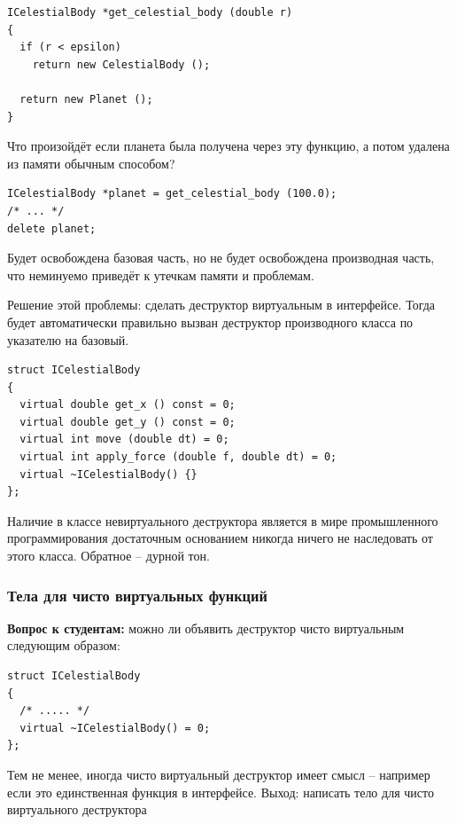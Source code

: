 \documentclass[a4paper,12pt,oneside]{article}
\newif\ifanswers
\begin{document}
\begin{lstlisting}
ICelestialBody *get_celestial_body (double r)
{
  if (r < epsilon)
    return new CelestialBody ();

  return new Planet ();
}
\end{lstlisting}

Что произойдёт если планета была получена через эту функцию, а потом удалена из памяти обычным способом?

\begin{lstlisting}
ICelestialBody *planet = get_celestial_body (100.0);
/* ... */
delete planet;
\end{lstlisting}

Будет освобождена базовая часть, но не будет освобождена производная часть, что неминуемо приведёт к утечкам памяти и проблемам. 

Решение этой проблемы: сделать деструктор виртуальным в интерфейсе. Тогда будет автоматически правильно вызван деструктор производного класса по указателю на базовый.

\begin{lstlisting}
struct ICelestialBody
{
  virtual double get_x () const = 0;
  virtual double get_y () const = 0;
  virtual int move (double dt) = 0;
  virtual int apply_force (double f, double dt) = 0;
  virtual ~ICelestialBody() {}
};
\end{lstlisting}

Наличие в классе невиртуального деструктора является в мире промышленного программирования достаточным основанием никогда ничего не наследовать от этого класса. Обратное – дурной тон. 

\subsubsection{Тела для чисто виртуальных функций}\label{VirtdestrBody}

\textbf{Вопрос к студентам:} можно ли объявить деструктор чисто виртуальным следующим образом:

\begin{lstlisting}
struct ICelestialBody
{
  /* ..... */
  virtual ~ICelestialBody() = 0;
};
\end{lstlisting}

\ifanswers
Правильный ответ: да, можно, но это приведет к pure virtual function call при попытке унчитожить любого наследника такого класса.
\fi

Тем не менее, иногда чисто виртуальный деструктор имеет смысл -- например если это единственная функция в интерфейсе. Выход: написать тело для чисто виртуального деструктора
\end{document}
